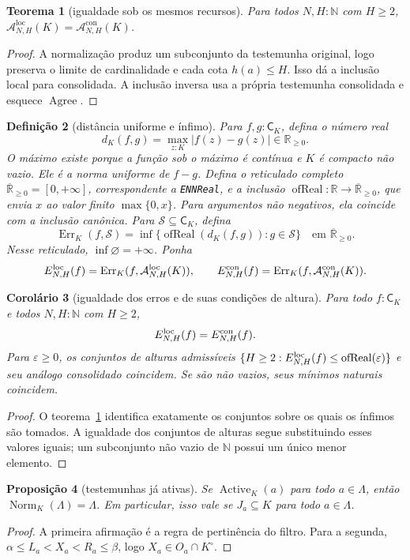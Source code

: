 \documentclass[11pt,a4paper]{article}
\newtheorem{definicao}{Definição}[section]
\newtheorem{teorema}[definicao]{Teorema}
\newtheorem{proposicao}[definicao]{Proposição}
\newtheorem{corolario}[definicao]{Corolário}
\newcommand{\N}{\mathbb N}
\newcommand{\R}{\mathbb R}
\newcommand{\CK}{\mathsf C_K}
\newcommand{\Norm}{\operatorname{Norm}}
\newcommand{\Act}{\operatorname{Active}}
\newcommand{\Agree}{\operatorname{Agree}}
\newcommand{\Aloc}{\mathcal A^{\mathrm{loc}}}
\newcommand{\Astr}{\mathcal A^{\mathrm{con}}}
\newcommand{\ERealPos}{\overline{\R}_{\ge0}}
\newcommand{\code}[1]{\nolinkurl{#1}}
\begin{document}
\begin{teorema}[igualdade sob os mesmos recursos]\label{thm:budget}
Para todos $N,H:\N$ com $H\ge2$,
$\Aloc_{N,H}(K)=\Astr_{N,H}(K)$.
\end{teorema}
\begin{proof}
A normalização produz um subconjunto da testemunha original, logo
preserva o limite de cardinalidade e cada cota $h(a)\le H$.
Isso dá a inclusão local para consolidada. A inclusão inversa usa
a própria testemunha consolidada e esquece $\Agree$.
\end{proof}

\begin{definicao}[distância uniforme e ínfimo]
Para $f,g:\CK$, defina o número real
\[
 d_K(f,g)=\max_{z:K}|f(z)-g(z)|\in\R_{\ge0}.
\]
O máximo existe porque a função sob o máximo é contínua e $K$ é
compacto não vazio. Ele é a norma uniforme de $f-g$.
Defina o reticulado completo
$\ERealPos=[0,+\infty]$, correspondente a \code{ENNReal}, e a inclusão
$\operatorname{ofReal}:\R\to\ERealPos$, que envia $x$ ao
valor finito $\max\{0,x\}$. Para argumentos não negativos, ela
coincide com a inclusão canônica.
Para $\mathcal S\subseteq\CK$, defina
\[
 \operatorname{Err}_K(f,\mathcal S)=
 \inf\{\operatorname{ofReal}(d_K(f,g)):g\in\mathcal S\}
 \quad\text{em }\ERealPos.
\]
Nesse reticulado, $\inf\varnothing=+\infty$. Ponha
\[
 E^{\rm loc}_{N,H}(f)=\operatorname{Err}_K(f,\Aloc_{N,H}(K)),\qquad
 E^{\rm con}_{N,H}(f)=\operatorname{Err}_K(f,\Astr_{N,H}(K)).
\]
\end{definicao}

\begin{corolario}[igualdade dos erros e de suas condições de altura]
Para todo $f:\CK$ e todos $N,H:\N$ com $H\ge2$,
\[
 E^{\rm loc}_{N,H}(f)=E^{\rm con}_{N,H}(f).
\]
Para $\varepsilon\ge0$, os conjuntos de alturas admissíveis
$\{H\ge2:E^{\rm loc}_{N,H}(f)\le\operatorname{ofReal}(\varepsilon)\}$
e seu análogo consolidado coincidem. Se são não vazios, seus mínimos
naturais coincidem.
\end{corolario}
\begin{proof}
O teorema~\ref{thm:budget} identifica exatamente os conjuntos sobre
os quais os ínfimos são tomados. A igualdade dos conjuntos de alturas
segue substituindo esses valores iguais; um subconjunto não vazio
de $\N$ possui um único menor elemento.
\end{proof}

\begin{proposicao}[testemunhas já ativas]\label{prop:fixed}
Se $\Act_K(a)$ para todo $a\in\Lambda$, então
$\Norm_K(\Lambda)=\Lambda$. Em particular, isso vale se
$J_a\subseteq K$ para todo $a\in\Lambda$.
\end{proposicao}
\begin{proof}
A primeira afirmação é a regra de pertinência do filtro. Para a
segunda, $\alpha\le L_a<X_a<R_a\le\beta$, logo
$X_a\in O_a\cap K^\circ$.
\end{proof}
\end{document}
